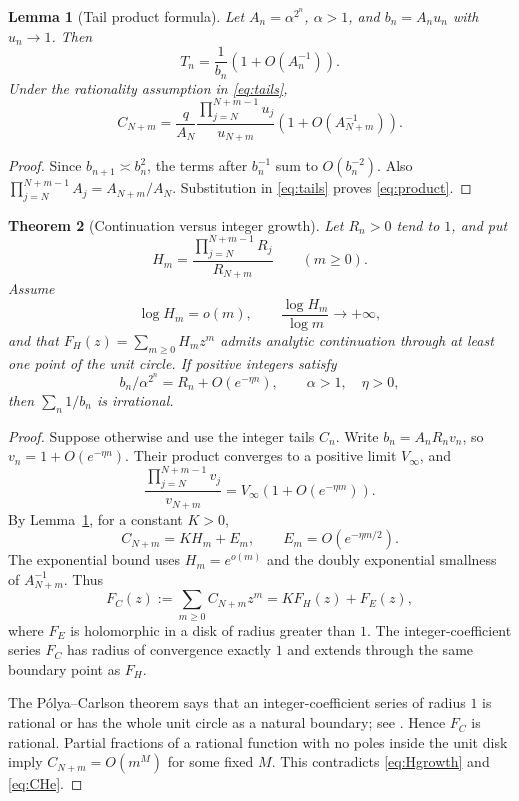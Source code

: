 \documentclass[11pt,a4paper]{article}
\newtheorem{theorem}{Theorem}[section]
\newtheorem{lemma}[theorem]{Lemma}
\theoremstyle{remark}\newtheorem{remark}[theorem]{Remark}
\begin{document}
\begin{lemma}[Tail product formula]\label{lem:product}
Let $A_n=\alpha^{2^n}$, $\alpha>1$, and $b_n=A_nu_n$ with $u_n\to1$.
Then
\[
 T_n=\frac1{b_n}\left(1+O(A_n^{-1})\right).
\]
Under the rationality assumption in \eqref{eq:tails},
\begin{equation}\label{eq:product}
 C_{N+m}=\frac q{A_N}
   \frac{\prod_{j=N}^{N+m-1}u_j}{u_{N+m}}
        \left(1+O(A_{N+m}^{-1})\right).
\end{equation}
\end{lemma}
\begin{proof}
Since $b_{n+1}\asymp b_n^2$, the terms after $b_n^{-1}$ sum to
$O(b_n^{-2})$. Also
$\prod_{j=N}^{N+m-1}A_j=A_{N+m}/A_N$. Substitution in
\eqref{eq:tails} proves \eqref{eq:product}.
\end{proof}

\begin{theorem}[Continuation versus integer growth]\label{thm:criterion}
Let $R_n>0$ tend to $1$, and put
\[
 H_m=\frac{\prod_{j=N}^{N+m-1}R_j}{R_{N+m}}\qquad(m\ge0).
\]
Assume
\begin{equation}\label{eq:Hgrowth}
 \log H_m=o(m),\qquad \frac{\log H_m}{\log m}\longrightarrow+\infty,
\end{equation}
and that $F_H(z)=\sum_{m\ge0}H_mz^m$ admits analytic continuation through
at least one point of the unit circle. If positive integers satisfy
\[
 b_n/\alpha^{2^n}=R_n+O(e^{-\eta n}),\qquad \alpha>1,\quad\eta>0,
\]
then $\sum_n1/b_n$ is irrational.
\end{theorem}
\begin{proof}
Suppose otherwise and use the integer tails $C_n$. Write
$b_n=A_nR_nv_n$, so $v_n=1+O(e^{-\eta n})$. Their product converges to a
positive limit $V_\infty$, and
\[
 \frac{\prod_{j=N}^{N+m-1}v_j}{v_{N+m}}
        =V_\infty(1+O(e^{-\eta m})).
\]
By Lemma~\ref{lem:product}, for a constant $K>0$,
\begin{equation}\label{eq:CHe}
 C_{N+m}=KH_m+E_m,\qquad E_m=O(e^{-\eta m/2}).
\end{equation}
The exponential bound uses $H_m=e^{o(m)}$ and the doubly exponential
smallness of $A_{N+m}^{-1}$. Thus
\[
 F_C(z):=\sum_{m\ge0}C_{N+m}z^m=K F_H(z)+F_E(z),
\]
where $F_E$ is holomorphic in a disk of radius greater than $1$.
The integer-coefficient series $F_C$ has radius of convergence exactly $1$
and extends through the same boundary point as $F_H$.

The P\'olya--Carlson theorem says that an integer-coefficient series of
radius $1$ is rational or has the whole unit circle as a natural boundary;
see \cite[Theorem~1.1]{pc}. Hence $F_C$ is rational. Partial fractions of a
rational function with no poles inside the unit disk imply
$C_{N+m}=O(m^M)$ for some fixed $M$. This contradicts
\eqref{eq:Hgrowth} and \eqref{eq:CHe}.
\end{proof}
\end{document}
